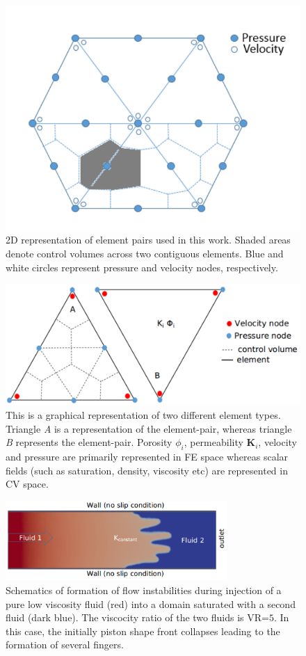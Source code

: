 
\begin{figure}[h]
\centering
\vbox{\includegraphics[width=.5\textwidth]{./Pics/P1DGP2.pdf}}
\caption{2D representation of  element pairs used in this work. Shaded areas denote control volumes across two contiguous elements. Blue and white circles represent pressure and velocity nodes, respectively.} 
\label{fig:fem_cv}
\end{figure}
\clearpage

\begin{figure}[h]
\centering
\vbox{\includegraphics[width=.75\textwidth]{./Pics/element_n.pdf}}
\caption{This is a graphical representation of two different element types. Triangle {\it A} is a representation of the  element-pair, whereas triangle {\it B} represents the  element-pair. Porosity $\phi_{i}$, permeability {\bf K}$_{i}$, velocity and pressure are primarily represented in FE space whereas scalar fields (such as saturation, density, viscosity etc) are represented in CV space.}
\label{fig:fem_elem}
\end{figure}
\clearpage

\begin{figure}[h]
\centering
\vbox{\includegraphics[width=0.75\textwidth]{./Pics/phase_vol_frac_uni_perm_1.pdf}}
\caption{Schematics of formation of flow instabilities during injection of a pure low viscosity fluid (red) into a domain saturated with a second fluid (dark blue). The viscocity ratio of the two fluids is VR=$5$. In this case, the initially piston shape front collapses leading to the formation of several fingers.}
\label{fig:simple_case}
\end{figure}
\clearpage


